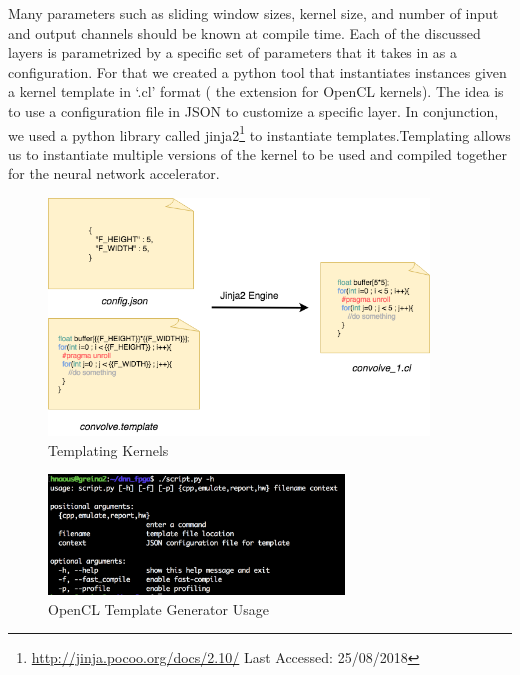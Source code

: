Many parameters such as sliding window sizes, kernel size, and number of input and output channels should be known at compile time. Each of the discussed layers is parametrized by a specific set of parameters that it takes in as a configuration. For that we created a python tool that instantiates instances  given a kernel template in ‘.cl’ format ( the extension for OpenCL kernels). The idea is to use a configuration file in JSON to customize a specific layer. In conjunction, we used a python library called jinja2\footnote{\url{http://jinja.pocoo.org/docs/2.10/} Last Accessed: 25/08/2018} to instantiate templates.Templating allows us to instantiate multiple versions of the kernel to be used and compiled together for the neural network accelerator.


\begin{figure}[h!]
\centering
\includegraphics[width=0.9\textwidth]{Figures/jinja}
\decoRule
\caption[Templating Kernels]{ Templating Kernels }
\label{fig:jinja}
\end{figure}

\begin{figure}[h!]
\centering
\includegraphics[width=0.7\textwidth]{Figures/usage}
\decoRule
\caption[Tempate Generator Usage]{ OpenCL Template Generator Usage }
\label{fig:usage}
\end{figure}


